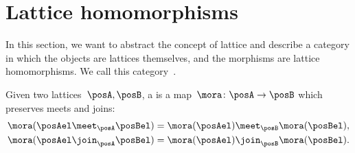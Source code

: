 \section{Lattice homomorphisms}
In this section, we want to abstract the concept of lattice and describe a category in which the objects are lattices themselves, and the morphisms are lattice homomorphisms.
We call this category~\Lat.

\begin{ctdefinition}
    \label{def:lattice_homomorphism}
    Given two lattices~$\posA, \posB$, a \emph{} is a map~$\mora\colon \posA\to \posB$ which preserves meets and joins:
    \begin{equation}
        \begin{aligned}
            \mora(\posAel \meet_\posA \posBel) & = \mora(\posAel) \meet_\posB \mora(\posBel), \\
            \mora(\posAel \join_\posA \posBel) & = \mora(\posAel) \join_\posB \mora(\posBel).
        \end{aligned}
    \end{equation}
\end{ctdefinition}

